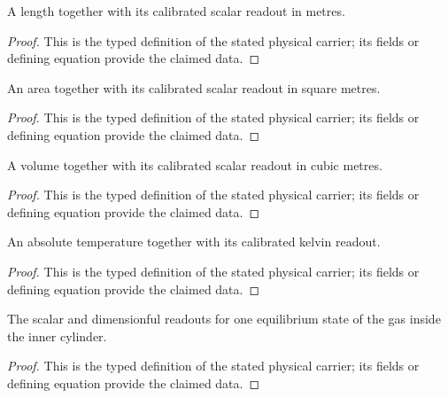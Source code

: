 \begin{definition}
  \label{def:physics:IPhO_2026_4_B_4:aux002}
  A length together with its calibrated scalar readout in metres.
\end{definition}
\begin{proof}
  This is the typed definition of the stated physical carrier; its fields or defining equation provide the claimed data.
\end{proof}

\begin{definition}
  \label{def:physics:IPhO_2026_4_B_4:aux003}
  An area together with its calibrated scalar readout in square metres.
\end{definition}
\begin{proof}
  This is the typed definition of the stated physical carrier; its fields or defining equation provide the claimed data.
\end{proof}

\begin{definition}
  \label{def:physics:IPhO_2026_4_B_4:aux004}
  A volume together with its calibrated scalar readout in cubic metres.
\end{definition}
\begin{proof}
  This is the typed definition of the stated physical carrier; its fields or defining equation provide the claimed data.
\end{proof}

\begin{definition}
  \label{def:physics:IPhO_2026_4_B_4:aux005}
  An absolute temperature together with its calibrated kelvin readout.
\end{definition}
\begin{proof}
  This is the typed definition of the stated physical carrier; its fields or defining equation provide the claimed data.
\end{proof}

\begin{definition}
  \label{def:physics:IPhO_2026_4_B_4:aux006}
  The scalar and dimensionful readouts for one equilibrium state of the gas inside the inner cylinder.
\end{definition}
\begin{proof}
  This is the typed definition of the stated physical carrier; its fields or defining equation provide the claimed data.
\end{proof}

